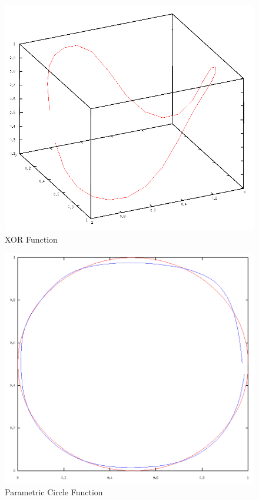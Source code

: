 \documentclass{article}
\begin{document}
\begin{figure}[tb]
	\begin{center}
		\includegraphics[scale=0.5]{img/xor2}
	\end{center}
	\caption{XOR Function}
	\label{fig:xor2}
\end{figure}

\begin{figure}[tb]
	\begin{center}
		\includegraphics[scale=0.5]{img/circle}
	\end{center}
	\caption{Parametric Circle Function}
	\label{fig:circle}
\end{figure}
\end{document}
